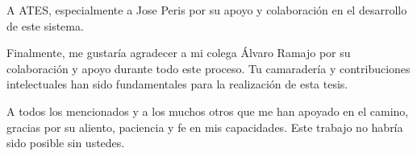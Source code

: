 \documentclass[oneside, 12pt, a4paper]{book}
\begin{document}
A ATES, especialmente a Jose Peris por su apoyo y colaboración en el desarrollo de este sistema.

Finalmente, me gustaría agradecer a mi colega Álvaro Ramajo por su colaboración y apoyo durante todo este proceso. Tu camaradería y contribuciones intelectuales han sido fundamentales para la realización de esta tesis.

A todos los mencionados y a los muchos otros que me han apoyado en el camino, gracias por su aliento, paciencia y fe en mis capacidades. Este trabajo no habría sido posible sin ustedes.

\endgroup

\blankpage%

\renewcommand{\contentsname}{Table of Contents}
\tableofcontents

\blankpage%

\listoffigures

\blankpage%

\listoftables

\blankpage%

\printglossary[type=\acronymtype,style=long, title=List of Acronyms]

\blankpage%

\mainmatter%








\label{part:theoretical_background}




\label{part:state_of_the_art}




\label{part:methodology}





\label{part:results}




\label{part:conclusions}






\blankpage%
\printbibliography%
\end{document}
